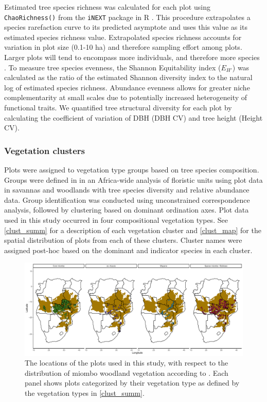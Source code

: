 \documentclass[11pt,a4paper]{article}
\begin{document}
Estimated tree species richness was calculated for each plot using \verb|ChaoRichness()| from the \verb|iNEXT| package in R \citep{Hsieh2016}. This procedure extrapolates a species rarefaction curve to its predicted asymptote and uses this value as its estimated species richness value. Extrapolated species richness accounts for variation in plot size (0.1-10 ha) and therefore sampling effort among plots. Larger plots will tend to encompass more individuals, and therefore more species \citep{Dengler2009}. To measure tree species  evenness, the Shannon Equitability index ($E_{H'}$) \citep{Smith1996} was calculated as the ratio of the estimated Shannon diversity index to the natural log of estimated species richness. Abundance evenness allows for greater niche complementarity at small scales due to potentially increased heterogeneity of functional traits. We quantified tree structural diversity for each plot by calculating the coefficient of variation of DBH (DBH CV) and tree height (Height CV). 

\subsubsection{Vegetation clusters}

Plots were assigned to vegetation type groups based on tree species composition. Groups were defined in \citet{Fayolle2018} in an Africa-wide analysis of floristic units using plot data in savannas and woodlands with tree species diversity and relative abundance data. Group identification was conducted using unconstrained correspondence analysis, followed by clustering based on dominant ordination axes. Plot data used in this study occurred in four compositional vegetation types. See \autoref{clust_summ} for a description of each vegetation cluster and \autoref{clust_map} for the spatial distribution of plots from each of these clusters. Cluster names were assigned post-hoc based on the dominant and indicator species in each cluster.

\begin{landscape}


\begin{figure}[H]
\centering
	\includegraphics[width=1.4\textwidth]{clust_map}
	\caption{The locations of the \nplots{} plots used in this study, with respect to the distribution of miombo woodland vegetation according to \citet{White1987}. Each panel shows plots categorized by their vegetation type as defined by the vegetation types in \autoref{clust_summ}.}
	\label{clust_map}
\end{figure}
\end{landscape}
\end{document}
